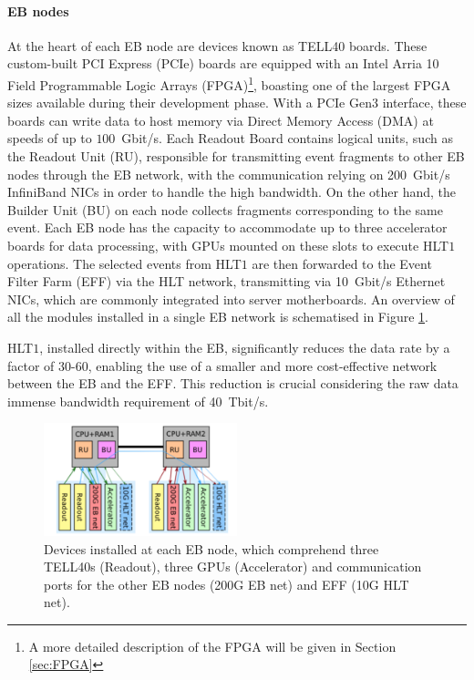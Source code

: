 \paragraph{EB nodes}
At the heart of each EB node are devices known as TELL40 boards. These custom-built PCI Express (PCIe) boards are equipped with an Intel Arria 10 Field Programmable Logic Arrays (FPGA)\footnote{A more detailed description of the FPGA will be given in Section \ref{sec:FPGA}}, boasting one of the largest FPGA sizes available during their development phase. With a PCIe Gen3 interface, these boards can write data to host memory via Direct Memory Access (DMA) at speeds of up to $100$~Gbit/s. Each Readout Board contains logical units, such as the Readout Unit (RU), responsible for transmitting event fragments to other EB nodes through the EB network, with the communication relying on 200~Gbit/s InfiniBand NICs in order to handle the high bandwidth. On the other hand, the Builder Unit (BU) on each node collects fragments corresponding to the same event. Each EB node has the capacity to accommodate up to three accelerator boards for data processing, with GPUs mounted on these slots to execute HLT$1$ operations. The selected events from HLT$1$ are then forwarded to the Event Filter Farm (EFF) via the HLT network, transmitting via 10~Gbit/s Ethernet NICs, which are commonly integrated into server motherboards. An overview of all the modules installed in a single EB network is schematised in Figure \ref{devices_EBnode}.

HLT$1$, installed directly within the EB, significantly reduces the data rate by a factor of 30-60, enabling the use of a smaller and more cost-effective network between the EB and the EFF. This reduction is crucial considering the raw data immense bandwidth requirement of 40~Tbit/s.

\begin{figure}
\centering
    \includegraphics[width=0.5\textwidth]{figures/zoom_EB_node.png}
    \caption{Devices installed at each EB node, which comprehend three TELL40s (Readout), three GPUs (Accelerator) and communication ports for the other EB nodes (200G EB net) and EFF (10G HLT net).}\label{devices_EBnode}
\end{figure}

